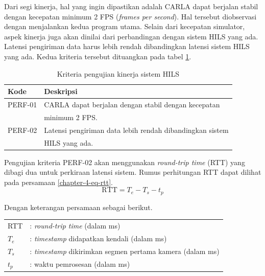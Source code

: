 Dari segi kinerja, hal yang ingin dipastikan adalah CARLA dapat berjalan stabil
dengan kecepatan minimum 2 FPS (\textit{frames per second}). Hal tersebut
diobservasi dengan menjalankan kedua program utama. Selain dari kecepatan
simulator, aspek kinerja juga akan dinilai dari perbandingan dengan sistem HILS
yang ada. Latensi pengiriman data harus lebih rendah dibandingkan latensi sistem
HILS yang ada. Kedua kriteria tersebut dituangkan pada tabel
\ref{chapter-4-tbl-perf-criteria}.
\begin{table}[!htbp]
	\begin{center}
		\begin{tabular}{|l|l|}
			\hline
			\textbf{Kode} & \textbf{Deskripsi}                                       \\
			\hline
			PERF-01       & CARLA dapat berjalan dengan stabil dengan kecepatan      \\
			              & minimum 2 FPS.                                           \\
			\hline
			PERF-02       & Latensi pengiriman data lebih rendah dibandingkan sistem \\
			              & HILS yang ada.                                           \\
			\hline
		\end{tabular}
	\end{center}
	\caption{Kriteria pengujian kinerja sistem HILS}
	\label{chapter-4-tbl-perf-criteria}
\end{table}

Pengujian kriteria PERF-02 akan menggunakan \textit{round-trip time} (RTT) yang
dibagi dua untuk perkiraan latensi sistem. Rumus perhitungan RTT dapat dilihat
pada persamaan \ref{chapter-4-eq-rtt}.
\begin{equation}
	\label{chapter-4-eq-rtt}
	\text{RTT} = T_{e} - T_{s} - t_p
\end{equation}

Dengan keterangan persamaan sebagai berikut.
\begin{table}[!h]
	\begin{tabular}{l l}
		RTT     & :     \textit{round-trip time} (dalam ms)             \\
		$T_{e}$ & : \textit{timestamp} didapatkan kendali (dalam ms)    \\
		$T_{s}$ & : \textit{timestamp} dikirimkan segmen pertama kamera
		(dalam ms)                                                      \\
		$t_p$   & :   waktu pemrosesan (dalam ms)
	\end{tabular}
\end{table}


